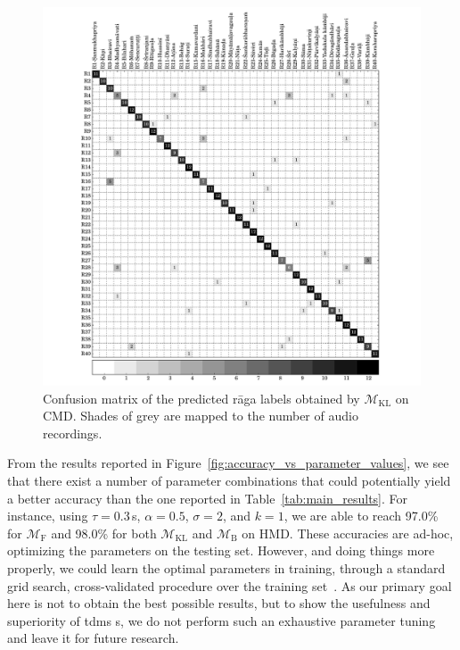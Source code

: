\begin{figure}
	\begin{center}
		\includegraphics[width=\figSizeHundred]{ch07_ragaRecognition/figures/carnaticPhaseSapce_config_1078.pdf}
	\end{center}\vspace{-1em}
	\caption{Confusion matrix of the predicted r\={a}ga labels obtained by $\mathcal{M}_{\mathrm{KL}}$ on CMD. Shades of grey are mapped to the number of audio recordings.} 
	\label{fig:confusion_mtx_carnatic}\vspace{-1em}
\end{figure}

From the results reported in Figure~\ref{fig:accuracy_vs_parameter_values}, we see that there exist a number of parameter combinations that could potentially yield a better accuracy than the one reported in Table~\ref{tab:main_results}. For instance, using  $\tau=0.3$\,s, $\alpha=0.5$, $\sigma=2$, and $k=1$, we are able to reach 97.0\% for $\mathcal{M}_{\mathrm{F}}$ and 98.0\% for both $\mathcal{M}_{\mathrm{KL}}$ and $\mathcal{M}_{\mathrm{B}}$ on HMD. These accuracies are ad-hoc, optimizing the parameters on the testing set. However, and doing things more properly, we could learn the optimal parameters in training, through a standard grid search, cross-validated procedure over the training set~\cite{Mitchell97BOOK}. As our primary goal here is not to obtain the best possible results, but to show the usefulness and superiority of \gls{tdms} s, we do not perform such an exhaustive parameter tuning and leave it for future research.

